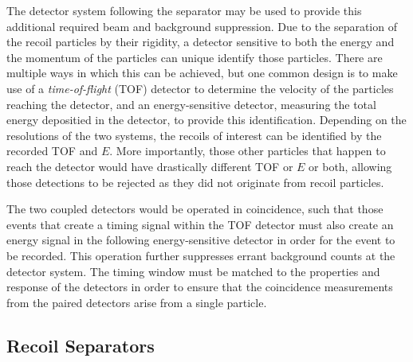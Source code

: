 The detector system following the separator may be used to provide this
additional required beam and background suppression. Due to the separation of
the recoil particles by their rigidity, a detector sensitive to both the energy
and the momentum of the particles can unique identify those particles. There
are multiple ways in which this can be achieved, but one common design is to
make use of a \textit{time-of-flight} (TOF) detector to determine the velocity of the
particles reaching the detector, and an energy-sensitive detector, measuring
the total energy depositied in the detector, to provide this identification.
Depending on the resolutions of the two systems, the recoils of interest can
be identified by the recorded TOF and $E$. More importantly, those other
particles that happen to reach the detector would have drastically different
TOF or $E$ or both, allowing those detections to be rejected as they did not
originate from recoil particles.

The two coupled detectors would be operated in coincidence, such that those
events that create a timing signal within the TOF detector must also create an
energy signal in the following energy-sensitive detector in order for the
event to be recorded. This operation further suppresses errant background
counts at the detector system. The timing window must be matched to the
properties and response of the detectors in order to ensure that the
coincidence measurements from the paired detectors arise from a single
particle.


\subsection{Recoil Separators}
\label{sec:prevwork}


